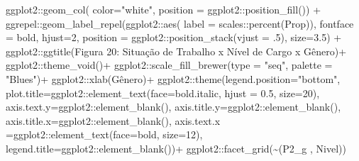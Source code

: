 \documentclass[
]{article}
\newenvironment{Shaded}{\begin{snugshade}}{\end{snugshade}}
\newcommand{\AttributeTok}[1]{\textcolor[rgb]{0.77,0.63,0.00}{#1}}
\newcommand{\DecValTok}[1]{\textcolor[rgb]{0.00,0.00,0.81}{#1}}
\newcommand{\FloatTok}[1]{\textcolor[rgb]{0.00,0.00,0.81}{#1}}
\newcommand{\FunctionTok}[1]{\textcolor[rgb]{0.00,0.00,0.00}{#1}}
\newcommand{\NormalTok}[1]{#1}
\newcommand{\SpecialCharTok}[1]{\textcolor[rgb]{0.00,0.00,0.00}{#1}}
\newcommand{\StringTok}[1]{\textcolor[rgb]{0.31,0.60,0.02}{#1}}
\begin{document}
\begin{Shaded}
\begin{Highlighting}[]
\NormalTok{  ggplot2}\SpecialCharTok{::}\FunctionTok{geom\_col}\NormalTok{( }\AttributeTok{color=}\StringTok{"white"}\NormalTok{,}
                     \AttributeTok{position =}\NormalTok{ ggplot2}\SpecialCharTok{::}\FunctionTok{position\_fill}\NormalTok{()) }\SpecialCharTok{+}
\NormalTok{  ggrepel}\SpecialCharTok{::}\FunctionTok{geom\_label\_repel}\NormalTok{(ggplot2}\SpecialCharTok{::}\FunctionTok{aes}\NormalTok{(}
    \AttributeTok{label =}\NormalTok{ scales}\SpecialCharTok{::}\FunctionTok{percent}\NormalTok{(Prop)),}
    \AttributeTok{fontface =} \StringTok{\textquotesingle{}bold\textquotesingle{}}\NormalTok{,}
    \AttributeTok{hjust=}\DecValTok{2}\NormalTok{,}
    \AttributeTok{position =}\NormalTok{ ggplot2}\SpecialCharTok{::}\FunctionTok{position\_stack}\NormalTok{(}\AttributeTok{vjust =}\NormalTok{ .}\DecValTok{5}\NormalTok{),}
    \AttributeTok{size=}\FloatTok{3.5}\NormalTok{) }\SpecialCharTok{+}
\NormalTok{  ggplot2}\SpecialCharTok{::}\FunctionTok{ggtitle}\NormalTok{(}\StringTok{\textquotesingle{}Figura 20: Situação de Trabalho x Nível de Cargo x Gênero\textquotesingle{}}\NormalTok{)}\SpecialCharTok{+}
\NormalTok{  ggplot2}\SpecialCharTok{::}\FunctionTok{theme\_void}\NormalTok{()}\SpecialCharTok{+}
\NormalTok{  ggplot2}\SpecialCharTok{::}\FunctionTok{scale\_fill\_brewer}\NormalTok{(}\AttributeTok{type =} \StringTok{"seq"}\NormalTok{, }\AttributeTok{palette =} \StringTok{"Blues"}\NormalTok{)}\SpecialCharTok{+}
\NormalTok{  ggplot2}\SpecialCharTok{::}\FunctionTok{xlab}\NormalTok{(}\StringTok{\textquotesingle{}Gênero\textquotesingle{}}\NormalTok{)}\SpecialCharTok{+}
\NormalTok{  ggplot2}\SpecialCharTok{::}\FunctionTok{theme}\NormalTok{(}\AttributeTok{legend.position=}\StringTok{"bottom"}\NormalTok{,}
                 \AttributeTok{plot.title=}\NormalTok{ggplot2}\SpecialCharTok{::}\FunctionTok{element\_text}\NormalTok{(}\AttributeTok{face=}\StringTok{\textquotesingle{}bold.italic\textquotesingle{}}\NormalTok{,}
                                                  \AttributeTok{hjust =} \FloatTok{0.5}\NormalTok{, }\AttributeTok{size=}\DecValTok{20}\NormalTok{),}
                 \AttributeTok{axis.text.y=}\NormalTok{ggplot2}\SpecialCharTok{::}\FunctionTok{element\_blank}\NormalTok{(),}
                 \AttributeTok{axis.title.y=}\NormalTok{ggplot2}\SpecialCharTok{::}\FunctionTok{element\_blank}\NormalTok{(),}
                 \AttributeTok{axis.title.x=}\NormalTok{ggplot2}\SpecialCharTok{::}\FunctionTok{element\_blank}\NormalTok{(),}
                 \AttributeTok{axis.text.x =}\NormalTok{ggplot2}\SpecialCharTok{::}\FunctionTok{element\_text}\NormalTok{(}\AttributeTok{face=}\StringTok{\textquotesingle{}bold\textquotesingle{}}\NormalTok{, }\AttributeTok{size=}\DecValTok{12}\NormalTok{),}
                 \AttributeTok{legend.title=}\NormalTok{ggplot2}\SpecialCharTok{::}\FunctionTok{element\_blank}\NormalTok{())}\SpecialCharTok{+}
\NormalTok{  ggplot2}\SpecialCharTok{::}\FunctionTok{facet\_grid}\NormalTok{(}\SpecialCharTok{\textasciitilde{}}\StringTok{\textasciigrave{}}\AttributeTok{(\textquotesingle{}P2\_g \textquotesingle{}, \textquotesingle{}Nivel\textquotesingle{})}\StringTok{\textasciigrave{}}\NormalTok{)}
\end{Highlighting}
\end{Shaded}
\end{document}
